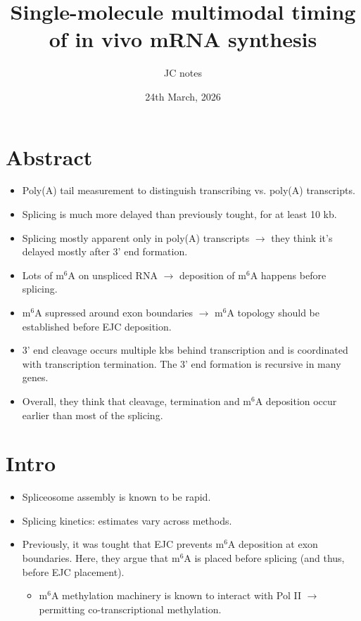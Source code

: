 \documentclass{article}
\title{Single-molecule multimodal timing of in vivo mRNA synthesis}
\author{JC notes}
\date{24th March, 2026}
\begin{document}
	
	
	\maketitle
	
	\section{Abstract}
	\begin{itemize}
		\item Poly(A) tail measurement to distinguish transcribing vs. poly(A) transcripts.
		\item Splicing is much more delayed than previously tought, for at least 10 kb. 
		\item Splicing mostly apparent only in poly(A) transcripts $\to$ they think it's delayed mostly after 3' end formation. 
		\item Lots of $\text{m}^{6}$A on unspliced RNA $\to$ deposition of $\text{m}^{6}$A happens before splicing.
		\item $\text{m}^{6}$A supressed around exon boundaries $\to$ $\text{m}^{6}$A topology should be established before EJC deposition.
		\item 3' end cleavage occurs multiple kbs behind transcription and is coordinated with transcription termination. The 3' end formation is recursive in many genes.
		\item Overall, they think that cleavage, termination and $\text{m}^{6}$A deposition occur earlier than most of the splicing.
	\end{itemize}
	
	\section{Intro}
	\begin{itemize}
		\item Spliceosome assembly is known to be rapid. 
		\item Splicing kinetics: estimates vary across methods.
		\item Previously, it was tought that EJC prevents $\text{m}^{6}$A deposition at exon boundaries. Here, they argue that $\text{m}^{6}$A is placed before splicing (and thus, before EJC placement).
		\begin{itemize}
			\item $\text{m}^{6}$A methylation machinery is known to interact with Pol II $\to$ permitting co-transcriptional methylation.
		\end{itemize}
		
	\end{itemize}
	
\end{document}
